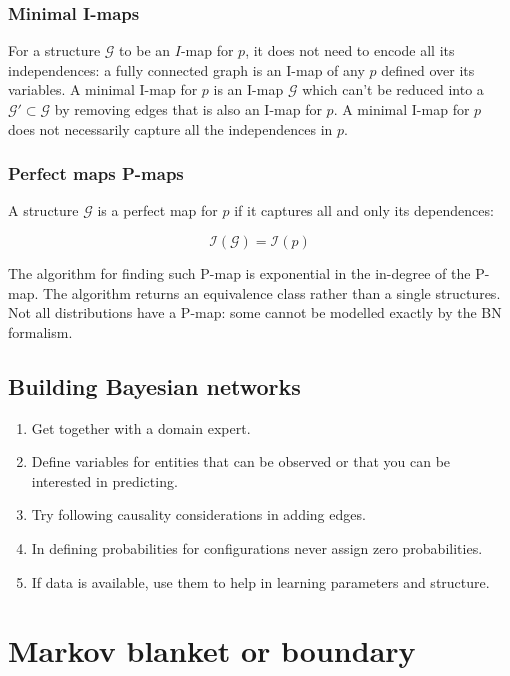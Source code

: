 		\subsubsection{Minimal I-maps}
		For a structure $\mathcal{G}$ to be an $I$-map for $p$, it does not need to encode all its independences: a fully connected graph is an I-map of any $p$ defined over its variables.
		A minimal I-map for $p$ is an I-map $\mathcal{G}$ which can't be reduced into a $\mathcal{G}'\subset\mathcal{G}$ by removing edges that is also an I-map for $p$.
		A minimal I-map for $p$ does not necessarily capture all the independences in $p$.

		\subsubsection{Perfect maps P-maps}
		A structure $\mathcal{G}$ is a perfect map for $p$ if it captures all and only its dependences:

		$$\mathcal{I}(\mathcal{G}) = \mathcal{I}(p)$$

		The algorithm for finding such P-map is exponential in the in-degree of the P-map.
		The algorithm returns an equivalence class rather than a single structures.
		Not all distributions have a P-map: some cannot be modelled exactly by the BN formalism.

	\subsection{Building Bayesian networks}
	\begin{multicols}{2}
		\begin{enumerate}
			\item Get together with a domain expert.
			\item Define variables for entities that can be observed or that you can be interested in predicting.
			\item Try following causality considerations in adding edges.
			\item In defining probabilities for configurations never assign zero probabilities.
			\item If data is available, use them to help in learning parameters and structure.
		\end{enumerate}
	\end{multicols}

\section{Markov blanket or boundary}

